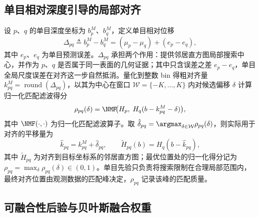 \subsection{单目相对深度引导的局部对齐}
\label{sec:alignment}

设 $p$、$q$ 的单目深度坐标为 $b_p^M$、$b_q^M$，定义单目相对位移
\begin{equation}
  \Delta_{pq}\triangleq b_p^M-b_q^M=(\mu_p-\mu_q)+(e_p-e_q),
  \label{eq:delta}
\end{equation}
其中 $e_p$、$e_q$ 为单目预测误差。$\Delta_{pq}$ 承担两个作用：提供邻居直方图局部搜索中心，并作为 $p$、$q$ 是否属于同一表面的几何证据；其中只含误差之差 $e_p-e_q$，单目全局尺度误差在对齐这一步自然抵消。量化到整数 bin 得粗对齐量 $k_{pq}^{M}=\operatorname{round}(\Delta_{pq})$，以其为中心在窗口 $\mathcal{W}=\{-K,\dots,K\}$ 内对候选偏移 $\delta$ 计算归一化匹配滤波得分
\begin{equation}
  \rho_{pq}(\delta)
  =\NMF\!\big(H_p,\;H_q(b-k_{pq}^{M}-\delta)\big),
  \label{eq:nmf}
\end{equation}
其中 $\NMF(\cdot,\cdot)$ 为归一化匹配滤波算子。取 $\hat\delta_{pq}=\argmax_{\delta\in\mathcal{W}}\rho_{pq}(\delta)$，则实际用于对齐的平移量为
\begin{equation}
  \hat k_{pq}=k_{pq}^{M}+\hat\delta_{pq},
  \qquad
  \widetilde H_{pq}(b)=H_q(b-\hat k_{pq}),
  \label{eq:final_shift}
\end{equation}
其中 $\widetilde H_{pq}$ 为对齐到目标坐标系的邻居直方图；最优位置处的归一化得分记为 $\rho_{pq}=\max_\delta\rho_{pq}(\delta)\in(0,1)$。单目先验只负责将搜索限制在合理局部范围内，最终对齐位置由观测数据的匹配峰决定，$\rho_{pq}$ 记录该峰的匹配质量。

\subsection{可融合性后验与贝叶斯融合权重}
\label{sec:fusibility}


